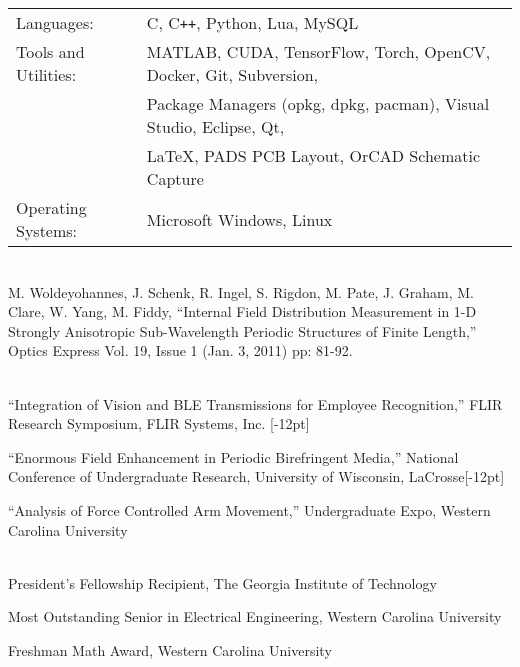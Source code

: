\documentclass[14pt,letterpaper]{extarticle}
\begin{document}

\medskip\noindent
\begin{tabularx}{\linewidth}{@{}lL@{}}
\footnotesize{Languages:} & \footnotesize{C, C\texttt{++}, Python, Lua, MySQL}\vspace{0.5mm}\\
\footnotesize{Tools and Utilities:} & \footnotesize{MATLAB, CUDA, TensorFlow, Torch, OpenCV, Docker, Git, Subversion,}\\
                                    & \footnotesize{Package Managers (opkg, dpkg, pacman), Visual Studio, Eclipse, Qt,}\\
                                    & \footnotesize{\LaTeX, PADS PCB Layout, OrCAD Schematic Capture}\vspace{0.5mm}\\
\footnotesize{Operating Systems:}   & \footnotesize{Microsoft Windows, Linux}\\
\end{tabularx}

\vspace{5.3pt}\\
\noindent
\footnotesize{M. Woldeyohannes, J. Schenk, R. Ingel, S. Rigdon, M. Pate, J. Graham, M. Clare, W. Yang, M. Fiddy, ``Internal Field Distribution Measurement in 1-D Strongly Anisotropic Sub-Wavelength Periodic Structures of Finite Length,'' Optics Express Vol. 19, Issue 1 (Jan. 3, 2011) pp: 81-92.}

\vspace{5.3pt}\\
\footnotesize{``Integration of Vision and BLE Transmissions for Employee Recognition,'' FLIR Research Symposium, FLIR Systems, Inc.}
[-12pt]

\medskip\noindent
\footnotesize{``Enormous  Field  Enhancement  in  Periodic  Birefringent Media,''
National Conference of Undergraduate Research, University of Wisconsin, LaCrosse}[-12pt]

\medskip\noindent
\footnotesize{``Analysis of Force Controlled Arm Movement,'' Undergraduate Expo, Western Carolina University}

\vspace{5.3pt}\\
\noindent\footnotesize{President's Fellowship Recipient, The Georgia Institute of Technology}

\medskip
\noindent\footnotesize{Most Outstanding Senior in Electrical Engineering, Western Carolina University}

\medskip
\noindent\footnotesize{Freshman Math Award, Western Carolina University}
\end{document}
